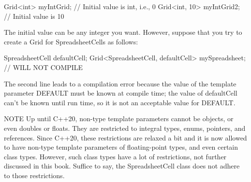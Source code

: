 \begin{cpp}
Grid<int> myIntGrid; // Initial value is int{}, i.e., 0
Grid<int, 10> myIntGrid2; // Initial value is 10
\end{cpp}

The initial value can be any integer you want. However, suppose that you try to create a Grid for SpreadsheetCells as follows:

\begin{cpp}
SpreadsheetCell defaultCell;
Grid<SpreadsheetCell, defaultCell> mySpreadsheet; // WILL NOT COMPILE
\end{cpp}

The second line leads to a compilation error because the value of the template parameter DEFAULT must be known at compile time; the value of defaultCell can’t be known until run time, so it is not an acceptable value for DEFAULT.

\begin{myNotic}{NOTE}
Up until C++20, non-type template parameters cannot be objects, or even doubles or floats. They are restricted to integral types, enums, pointers, and references. Since C++20, these restrictions are relaxed a bit and it is now allowed to have non-type template parameters of floating-point types, and even certain class types. However, such class types have a lot of restrictions, not further discussed in this book. Suffice to say, the SpreadsheetCell class does not adhere to those restrictions.
\end{myNotic}





























